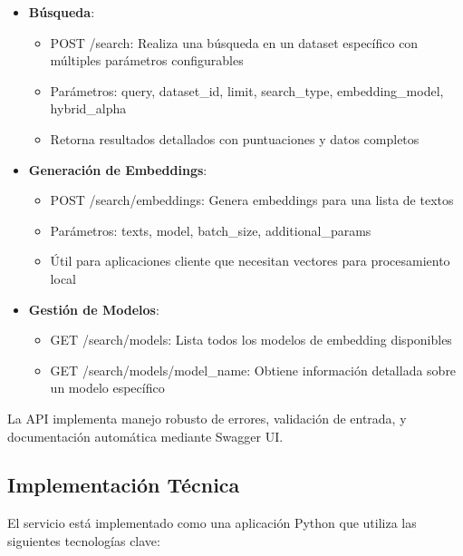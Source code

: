 \documentclass[12pt,a4paper]{article}
\begin{document}
\begin{itemize}
    \item \textbf{Búsqueda}:
    \begin{itemize}
        \item POST /search: Realiza una búsqueda en un dataset específico con múltiples parámetros configurables
        \item Parámetros: query, dataset\_id, limit, search\_type, embedding\_model, hybrid\_alpha
        \item Retorna resultados detallados con puntuaciones y datos completos
    \end{itemize}
    
    \item \textbf{Generación de Embeddings}:
    \begin{itemize}
        \item POST /search/embeddings: Genera embeddings para una lista de textos
        \item Parámetros: texts, model, batch\_size, additional\_params
        \item Útil para aplicaciones cliente que necesitan vectores para procesamiento local
    \end{itemize}
    
    \item \textbf{Gestión de Modelos}:
    \begin{itemize}
        \item GET /search/models: Lista todos los modelos de embedding disponibles
        \item GET /search/models/{model\_name}: Obtiene información detallada sobre un modelo específico
    \end{itemize}
\end{itemize}

La API implementa manejo robusto de errores, validación de entrada, y documentación automática mediante Swagger UI.

\subsection{Implementación Técnica}
\label{subsec:ss-implementacion}

El servicio está implementado como una aplicación Python que utiliza las siguientes tecnologías clave:
\end{document}
